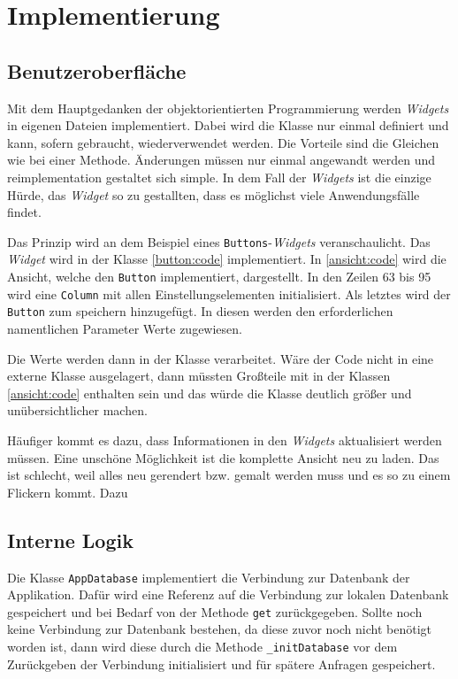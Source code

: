 \chapter{Implementierung}
\label{section:programmierung}
\section{Benutzeroberfläche}
Mit dem Hauptgedanken der objektorientierten Programmierung werden \textit{Widgets} in eigenen Dateien implementiert. Dabei wird die Klasse nur einmal definiert und kann, sofern gebraucht, wiederverwendet werden. Die Vorteile sind die Gleichen wie bei einer Methode. Änderungen müssen nur einmal angewandt werden und reimplementation gestaltet sich simple. In dem Fall der \textit{Widgets} ist die einzige Hürde, das \textit{Widget} so zu gestallten, dass es möglichst viele Anwendungsfälle findet.

Das Prinzip wird an dem Beispiel eines \texttt{Buttons}-\textit{Widgets} veranschaulicht. Das \textit{Widget} wird in der Klasse \ref{button:code}
implementiert. In \ref{ansicht:code} wird die Ansicht, welche den \texttt{Button} implementiert, dargestellt. In den Zeilen 63 bis 95 wird eine \texttt{Column} mit allen Einstellungselementen initialisiert. Als letztes wird der \texttt{Button} zum speichern hinzugefügt. In diesen werden den erforderlichen namentlichen Parameter Werte zugewiesen. 

Die Werte werden dann in der Klasse verarbeitet. Wäre der Code nicht in eine externe Klasse ausgelagert, dann müssten Großteile mit in der Klassen \ref{ansicht:code} enthalten sein und das würde die Klasse deutlich größer und unübersichtlicher machen. 

Häufiger kommt es dazu, dass Informationen in den \textit{Widgets} aktualisiert werden müssen. Eine unschöne Möglichkeit ist die komplette Ansicht neu zu laden. Das ist schlecht, weil alles neu gerendert bzw. gemalt werden muss und es so zu einem Flickern kommt. Dazu

\section{Interne Logik}
Die Klasse \texttt{AppDatabase} implementiert die Verbindung zur Datenbank der Applikation. Dafür wird eine Referenz auf die Verbindung zur lokalen Datenbank gespeichert und bei Bedarf von der Methode \texttt{get} zurückgegeben. Sollte noch keine Verbindung zur Datenbank bestehen, da diese zuvor noch nicht benötigt worden ist, dann wird diese durch die Methode \texttt{\_initDatabase} vor dem Zurückgeben der Verbindung initialisiert und für spätere Anfragen gespeichert.

